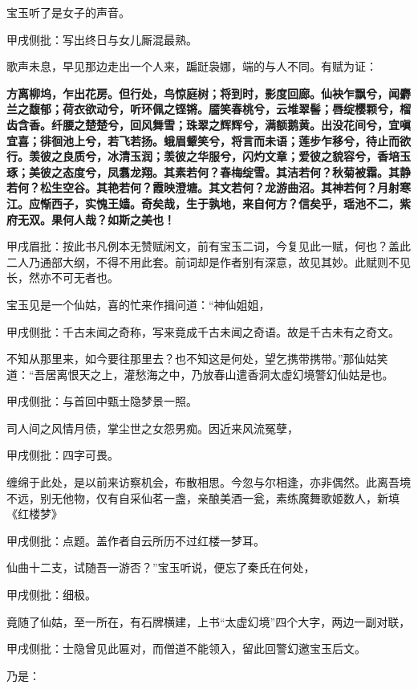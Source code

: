 \begin{parag}

    宝玉听了是女子的声音。\begin{note}甲戌侧批：写出终日与女儿厮混最熟。\end{note}歌声未息，早见那边走出一个人来，蹁跹袅娜，端的与人不同。有赋为证：
\end{parag}
\begin{qute2sp}
    \textbf{
        方离柳坞，乍出花房。但行处，鸟惊庭树；将到时，影度回廊。仙袂乍飘兮，闻麝兰之馥郁；荷衣欲动兮，听环佩之铿锵。靥笑春桃兮，云堆翠髻；唇绽樱颗兮，榴齿含香。纤腰之楚楚兮，回风舞雪；珠翠之辉辉兮，满额鹅黄。出没花间兮，宜嗔宜喜；徘徊池上兮，若飞若扬。蛾眉颦笑兮，将言而未语；莲步乍移兮，待止而欲行。羡彼之良质兮，冰清玉润；羡彼之华服兮，闪灼文章；爱彼之貌容兮，香培玉琢；美彼之态度兮，凤翥龙翔。其素若何？春梅绽雪。其洁若何？秋菊被霜。其静若何？松生空谷。其艳若何？霞映澄塘。其文若何？龙游曲沼。其神若何？月射寒江。应惭西子，实愧王嫱。奇矣哉，生于孰地，来自何方？信矣乎，瑶池不二，紫府无双。果何人哉？如斯之美也！}
    \begin{note}甲戌眉批：按此书凡例本无赞赋闲文，前有宝玉二词，今复见此一赋，何也？盖此二人乃通部大纲，不得不用此套。前词却是作者别有深意，故见其妙。此赋则不见长，然亦不可无者也。\end{note}

\end{qute2sp}
\begin{parag}

    宝玉见是一个仙姑，喜的忙来作揖问道：“神仙姐姐，\begin{note}甲戌侧批：千古未闻之奇称，写来竟成千古未闻之奇语。故是千古未有之奇文。\end{note}不知从那里来，如今要往那里去？也不知这是何处，望乞携带携带。”那仙姑笑道：“吾居离恨天之上，灌愁海之中，乃放春山遣香洞太虚幻境警幻仙姑是也。\begin{note}甲戌侧批：与首回中甄士隐梦景一照。\end{note}司人间之风情月债，掌尘世之女怨男痴。因近来风流冤孽，\begin{note}甲戌侧批：四字可畏。\end{note}缠绵于此处，是以前来访察机会，布散相思。今忽与尔相逢，亦非偶然。此离吾境不远，别无他物，仅有自采仙茗一盏，亲酿美酒一瓮，素练魔舞歌姬数人，新填《红楼梦》\begin{note}甲戌侧批：点题。盖作者自云所历不过红楼一梦耳。\end{note}仙曲十二支，试随吾一游否？”宝玉听说，便忘了秦氏在何处，\begin{note}甲戌侧批：细极。\end{note}竟随了仙姑，至一所在，有石牌横建，上书“太虚幻境”四个大字，两边一副对联，\begin{note}甲戌侧批：士隐曾见此匾对，而僧道不能领入，留此回警幻邀宝玉后文。\end{note}乃是：
\end{parag}


